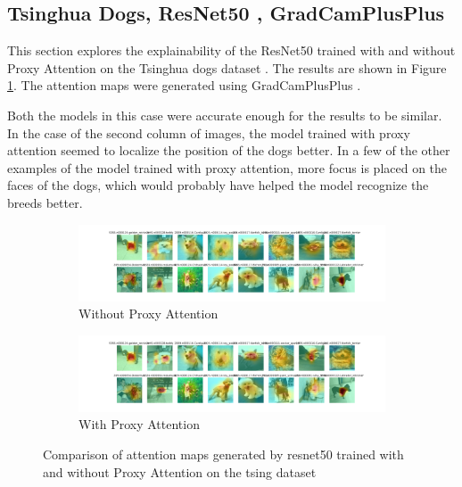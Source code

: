 \subsection{Tsinghua Dogs, ResNet50 , GradCamPlusPlus}
This section explores the explainability of the ResNet50 \cite{heDeepResidualLearning2016} trained with and without Proxy Attention on the Tsinghua dogs dataset \cite{zouNewDatasetDog2020}. The results are shown in Figure \ref{fig:resnet50_tsing}. The attention maps were generated using GradCamPlusPlus \cite{chattopadhayGradCAMGeneralizedGradientBased2018}.

Both the models in this case were accurate enough for the results to be similar. In the case of the second column of images, the model trained with proxy attention seemed to localize the position of the dogs better.  In a few of the other examples of the model trained with proxy attention, more focus is placed on the faces of the dogs, which would probably have helped the model recognize the breeds better.

\begin{figure}[!htb]
    \begin{subfigure}[b]{1\textwidth}
        \includegraphics[width=\linewidth]{images/gpp_tsing_resnet50_noproxy_0.pdf}
        \caption{Without Proxy Attention}
    \end{subfigure}
    \begin{subfigure}[b]{1\textwidth}
        \includegraphics[width=\linewidth]{images/gpp_tsing_resnet50_proxy_0.pdf}
        \caption{With Proxy Attention}
    \end{subfigure}
    \caption{Comparison of attention maps generated by resnet50 trained with and without Proxy Attention on the tsing dataset}
    \label{fig:resnet50_tsing}
\end{figure}


